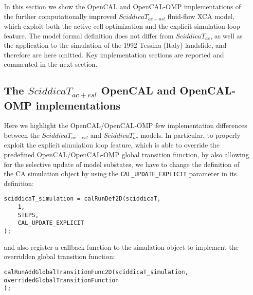 In this section we show the OpenCAL and OpenCAL-OMP implementations
of the further computationally improved $SciddicaT_{ac+asl}$
fluid-flow XCA model, which exploit both the active cell
optimization and the explicit simulation loop feature. The model
formal definition does not differ from $SciddicaT_{ac}$, as well as
the application to the simulation of the 1992 Tessina (Italy)
landslide, and therefore are here omitted. Key implementation
sections are reported and commented in the next section.

\subsection{The $SciddicaT_{ac+esl}$ OpenCAL and OpenCAL-OMP implementations}
Here we highlight the OpenCAL/OpenCAL-OMP few implementation
differences between the $SciddicaT_{ac+esl}$ and $SciddicaT_{ac}$
models. In particular, to properly exploit the explicit simulation
loop feature, which is able to override the predefined
OpenCAL/OpenCAL-OMP global transition function, by also allowing
for the selective update of model substates, we have to change the
definition of the CA simulation object by using the
\verb'CAL_UPDATE_EXPLICIT' parameter in its definition:
\begin{lstlisting}
sciddicaT_simulation = calRunDef2D(sciddicaT,
	1,
	STEPS,
	CAL_UPDATE_EXPLICIT
);
\end{lstlisting}

\noindent and also register a callback function to the simulation object to
implement the overridden global transition function:

\begin{lstlisting}
calRunAddGlobalTransitionFunc2D(sciddicaT_simulation,
overridedGlobalTransitionFunction
);
\end{lstlisting}

